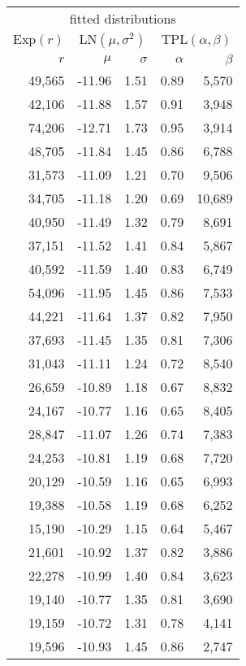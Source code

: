 \begin{tabular}{@{}rrrrr@{}}
\toprule
\multicolumn{5}{c}{fitted distributions}\\
\cmidrule(lr){1-5}
$\text{Exp}(r)$ & \multicolumn{2}{c}{$\text{LN}(\mu, \sigma^2)$} & \multicolumn{2}{c}{$\text{TPL}(\alpha, \beta)$}\\
\cmidrule(lr){1-5}
$r$ & $\mu$ & $\sigma$ & $\alpha$ & $\beta$\\
\cmidrule(lr){1-1} \cmidrule(lr){2-3} \cmidrule(lr){4-5}
49,565 & -11.96 & 1.51 & 0.89 & 5,570 \\
42,106 & -11.88 & 1.57 & 0.91 & 3,948 \\
74,206 & -12.71 & 1.73 & 0.95 & 3,914 \\
48,705 & -11.84 & 1.45 & 0.86 & 6,788 \\
31,573 & -11.09 & 1.21 & 0.70 & 9,506 \\
34,705 & -11.18 & 1.20 & 0.69 & 10,689 \\
40,950 & -11.49 & 1.32 & 0.79 & 8,691 \\
37,151 & -11.52 & 1.41 & 0.84 & 5,867 \\
40,592 & -11.59 & 1.40 & 0.83 & 6,749 \\
54,096 & -11.95 & 1.45 & 0.86 & 7,533 \\
44,221 & -11.64 & 1.37 & 0.82 & 7,950 \\
37,693 & -11.45 & 1.35 & 0.81 & 7,306 \\
31,043 & -11.11 & 1.24 & 0.72 & 8,540 \\
26,659 & -10.89 & 1.18 & 0.67 & 8,832 \\
24,167 & -10.77 & 1.16 & 0.65 & 8,405 \\
28,847 & -11.07 & 1.26 & 0.74 & 7,383 \\
24,253 & -10.81 & 1.19 & 0.68 & 7,720 \\
20,129 & -10.59 & 1.16 & 0.65 & 6,993 \\
19,388 & -10.58 & 1.19 & 0.68 & 6,252 \\
15,190 & -10.29 & 1.15 & 0.64 & 5,467 \\
21,601 & -10.92 & 1.37 & 0.82 & 3,886 \\
22,278 & -10.99 & 1.40 & 0.84 & 3,623 \\
19,140 & -10.77 & 1.35 & 0.81 & 3,690 \\
19,159 & -10.72 & 1.31 & 0.78 & 4,141 \\
19,596 & -10.93 & 1.45 & 0.86 & 2,747 \\
\bottomrule
\end{tabular}
